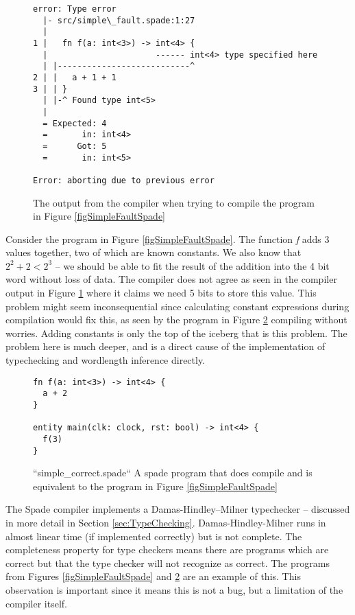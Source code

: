\begin{figure}
\centering
  \begin{verbatim}
error: Type error
  |- src/simple\_fault.spade:1:27
  |
1 |   fn f(a: int<3>) -> int<4> {
  |                      ------ int<4> type specified here
  | |---------------------------^
2 | |   a + 1 + 1
3 | | }
  | |-^ Found type int<5>
  |
  = Expected: 4
  =       in: int<4>
  =      Got: 5
  =       in: int<5>

Error: aborting due to previous error
\end{verbatim}
\caption{The output from the compiler when trying to compile the program in Figure \ref{figSimpleFaultSpade}}
\label{figSimpleFaultSpadeCompileOutput}
\end{figure}

Consider the program in Figure \ref{figSimpleFaultSpade}. The function \textit{f} adds 3 values together, two of which are known constants. We also know that $2^2 + 2 < 2^3$ -- we should be able to fit the result of the addition into the 4 bit word without loss of data. The compiler does not agree as seen in the compiler output in Figure \ref{figSimpleFaultSpadeCompileOutput} where it claims we need 5 bits to store this value. This problem might seem inconsequential since calculating constant expressions during compilation would fix this, as seen by the program in Figure \ref{figSimpleCorrectSpade} compiling without worries. Adding constants is only the top of the iceberg that is this problem. The problem here is much deeper, and is a direct cause of the implementation of typechecking and wordlength inference directly.

\begin{figure}
\centering
  \begin{verbatim}
fn f(a: int<3>) -> int<4> {
  a + 2
}

entity main(clk: clock, rst: bool) -> int<4> {
  f(3)
}
\end{verbatim}
  \caption{``simple\_correct.spade`` A spade program that does compile and is equivalent to the program in Figure \ref{figSimpleFaultSpade}}
\label{figSimpleCorrectSpade}
\end{figure}

The Spade compiler implements a Damas-Hindley–Milner typechecker -- discussed in more detail in Section \ref{sec:TypeChecking}. Damas-Hindley-Milner runs in almost linear time (if implemented correctly) but is not complete. The completeness property for type checkers means there are programs which are correct but that the type checker will not recognize as correct. The programs from Figures \ref{figSimpleFaultSpade} and \ref{figSimpleCorrectSpade} are an example of this. This observation is important since it means this is not a bug, but a limitation of the compiler itself.

